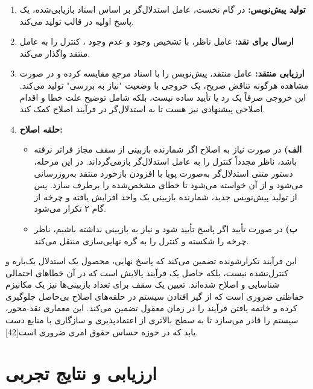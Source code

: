 \documentclass[12pt,a4paper]{report}
\begin{document}
	\begin{enumerate}
		\item \textbf{تولید پیش‌نویس:} در گام نخست، عامل استدلال‌گر بر اساس اسناد بازیابی‌شده، یک پاسخ اولیه در قالب  تولید می‌کند.
		
		\item \textbf{ارسال برای نقد:} عامل ناظر، با تشخیص وجود  و عدم وجود ، کنترل را به عامل منتقد واگذار می‌کند.
		
		\item \textbf{ارزیابی منتقد:} عامل منتقد، پیش‌نویس را با اسناد مرجع مقایسه کرده و در صورت مشاهده هرگونه تناقض صریح، یک خروجی  با وضعیت  "نیاز به بررسی" تولید می‌کند. این خروجی صرفاً یک رد یا تأیید ساده نیست، بلکه شامل توضیح علت خطا و اقدام اصلاحی پیشنهادی نیز هست تا به استدلال‌گر در فرآیند اصلاح کمک کند.
		
		\item \textbf{حلقه اصلاح:}
		\begin{itemize}
			\item \textbf{الف)} در صورت نیاز به اصلاح اگر شمارنده بازبینی از سقف مجاز فراتر نرفته باشد، ناظر مجدداً کنترل را به عامل استدلال‌گر بازمی‌گرداند. در این مرحله، دستور متنی استدلال‌گر به‌صورت پویا با افزودن بازخورد منتقد به‌روزرسانی می‌شود و از آن خواسته می‌شود تا خطای مشخص‌شده را برطرف سازد. پس از تولید پیش‌نویس جدید، شمارنده بازبینی یک واحد افزایش یافته و چرخه از گام ۲ تکرار می‌شود.
			
			\item \textbf{ب)} در صورت تأیید اگر پاسخ تأیید شود و نیاز به بازبینی نداشته باشیم، ناظر چرخه را شکسته و کنترل را به گره نهایی‌سازی منتقل می‌کند.
		\end{itemize}
	\end{enumerate}
	
	این فرآیند تکرارشونده تضمین می‌کند که پاسخ نهایی، محصول یک استدلال یک‌باره و کنترل‌نشده نیست، بلکه حاصل یک فرآیند پالایش است که در آن خطاهای احتمالی شناسایی و اصلاح شده‌اند. تعیین یک سقف برای تعداد بازبینی‌ها نیز یک مکانیزم حفاظتی ضروری است که از گیر افتادن سیستم در حلقه‌های اصلاح بی‌حاصل جلوگیری کرده و خاتمه یافتن فرآیند را در زمان معقول تضمین می‌کند. این معماری نقد-محور، سیستم را قادر می‌سازد تا به سطح بالاتری از اعتمادپذیری و سازگاری با منابع دست یابد که در حوزه حساس حقوق امری ضروری است[42].

	\section{ارزیابی و نتایج تجربی}
	
\end{document}

